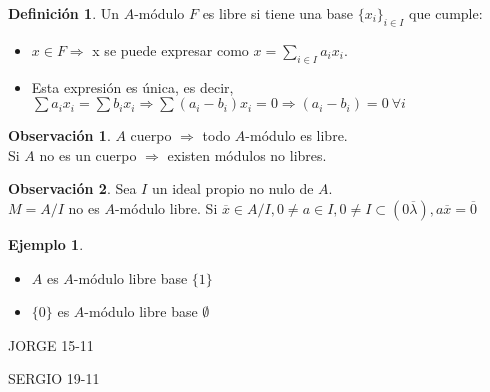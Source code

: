 \documentclass{article}
\theoremstyle{theorem-style}  %
\theoremstyle{definition}
\newtheorem{definition}{Definición}[section]
\newtheorem*{observation}{Observación} %
\theoremstyle{example-style}
\newtheorem{example}{Ejemplo}[section]
\begin{document}
\begin{definition}
	Un $ A $-módulo $ F $ es libre si tiene una base $\{x_i\}_{i\in I}$ que cumple:
	\begin{itemize}
		\item $x\in F\Rightarrow$ x se puede expresar como $x=\sum_{i\in I}a_i x_i$.
		\item Esta expresión es única, es decir, $\sum a_i x_i=\sum b_i x_i \Rightarrow \sum (a_i-b_i)x_i=0\Rightarrow (a_i-b_i)=0 \ \forall i$
	\end{itemize}
\end{definition}
\begin{observation}
	$ A $ cuerpo $ \Rightarrow $ todo $ A $-módulo es libre. \\
	Si $ A $ no es un cuerpo $ \Rightarrow $ existen módulos no libres.
\end{observation}
\begin{observation}
	Sea $ I $ un ideal propio no nulo de $ A $.\\
	$ M=A/I $ no es $ A $-módulo libre.
	Si $ \overline{x} \in A/I, 0\neq a\in I, 0\neq I \subset (0\overline{\lambda}), a\overline{x}=\overline{0} $
\end{observation}
\begin{example}
	\begin{itemize}
		\item $ A $ es $ A $-módulo libre base $ \{1\} $
		\item $ \{0\} $ es $ A $-módulo libre base $ \emptyset $
	\end{itemize}
\end{example}
JORGE 15-11

SERGIO 19-11
\end{document}

